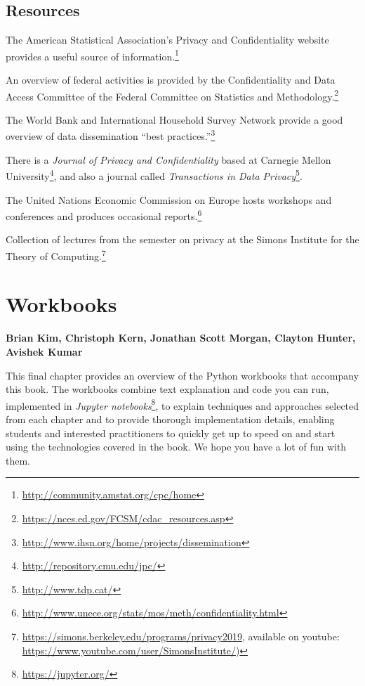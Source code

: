 \documentclass[]{krantz}
\begin{document}
\section{Resources}\label{resources-6}

The American Statistical Association's Privacy and Confidentiality
website provides a useful source of information.\footnote{\url{http://community.amstat.org/cpc/home}}

An overview of federal activities is provided by the Confidentiality and
Data Access Committee of the Federal Committee on Statistics and
Methodology.\footnote{\url{https://nces.ed.gov/FCSM/cdac_resources.asp}}

The World Bank and International Household Survey Network provide a good
overview of data dissemination ``best practices.''\footnote{\url{http://www.ihsn.org/home/projects/dissemination}}

There is a \emph{Journal of Privacy and Confidentiality} based at
Carnegie Mellon University\footnote{\url{http://repository.cmu.edu/jpc/}},
and also a journal called \emph{Transactions in Data Privacy}\footnote{\url{http://www.tdp.cat/}}.

The United Nations Economic Commission on Europe hosts workshops and
conferences and produces occasional reports.\footnote{\url{http://www.unece.org/stats/mos/meth/confidentiality.html}}

Collection of lectures from the semester on privacy at the Simons
Institute for the Theory of Computing.\footnote{\url{https://simons.berkeley.edu/programs/privacy2019},
  available on youtube:
  \url{https://www.youtube.com/user/SimonsInstitute/})}

\hypertarget{chap:workbooks}{\chapter{Workbooks}\label{chap:workbooks}}

\textbf{Brian Kim, Christoph Kern, Jonathan Scott Morgan, Clayton
Hunter, Avishek Kumar}

This final chapter provides an overview of the Python workbooks that
accompany this book. The workbooks combine text explanation and code you
can run, implemented in \emph{Jupyter notebooks}\footnote{\url{https://jupyter.org/}},
to explain techniques and approaches selected from each chapter and to
provide thorough implementation details, enabling students and
interested practitioners to quickly get up to speed on and start using
the technologies covered in the book. We hope you have a lot of fun with
them.
\end{document}
